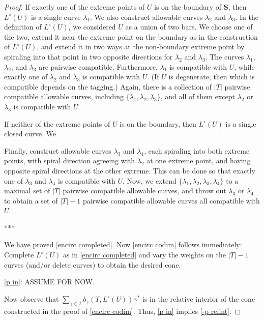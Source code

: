 \documentclass{amsart}
\theoremstyle{definition}
\theoremstyle{remark}
\numberwithin{equation}{section}
\newcommand{\set}[1]{{\lbrace #1 \rbrace}}
\newcommand{\0}{{\mathbf{0}}}
\renewcommand{\S}{\mathbf{S}}
\newcommand{\Compat}{\operatorname{Compat}}
\begin{document}
\begin{proof}
If exactly one of the extreme points of $U$ is on the boundary of $\S$, then $L^\circ(U)$ is a single curve $\lambda_1$.
We also construct allowable curves $\lambda_2$ and $\lambda_3$.
In the definition of $L^\circ(U)$, we considered $U$ as a union of two bars.
We choose one of the two, extend it near the extreme point on the boundary as in the construction of $L^\circ(U)$, and extend it in two ways at the non-boundary extreme point by spiraling into that point in two opposite directions for $\lambda_2$ and $\lambda_3$.
The curves $\lambda_1$, $\lambda_2$, and $\lambda_3$ are pairwise compatible.
Furthermore, $\lambda_1$ is compatible with $U$, while exactly one of $\lambda_2$ and $\lambda_3$ is compatible with $U$.  
(If $U$ is degenerate, then which is compatible depends on the tagging.)
Again, there is a collection of $|T|$ pairwise compatible allowable curves, including $\set{\lambda_1,\lambda_2,\lambda_3}$, and all of them except $\lambda_2$ or $\lambda_3$ is compatible with $U$.

If neither of the extreme points of $U$ is on the boundary, then $L^\circ(U)$ is a single closed curve.
We 

Finally, construct allowable curves $\lambda_3$ and $\lambda_4$, each spiraling into both extreme points, with spiral direction agreeing with $\lambda_2$ at one extreme point, and having opposite spiral directions at the other extreme.
This can be done so that exactly one of $\lambda_3$ and $\lambda_4$ is compatible with $U$.
Now, we extend $\set{\lambda_1,\lambda_2,\lambda_3,\lambda_4}$ to a maximal set of $|T|$ pairwise compatible allowable curves, and throw out $\lambda_3$ or $\lambda_4$ to obtain a set of $|T|-1$ pairwise compatible allowable curves all compatible with $U$.


***


We have proved \eqref{encirc completed}.
Now \eqref{encirc codim} follows immediately:  Complete $L^\circ(U)$ as in \eqref{encirc completed} and vary the weights on the $|T|-1$ curves (and/or delete curves) to obtain the desired cone.

\eqref{p in}:  ASSUME FOR NOW.

Now observe that $\sum_{\gamma\in T}b_\gamma(T,L^\circ(U))\gamma^*$ is in the relative interior of the cone constructed in the proof of \eqref{encirc codim}.
Thus, \eqref{p in} implies \eqref{-p relint}. %
\end{proof}
\end{document}
